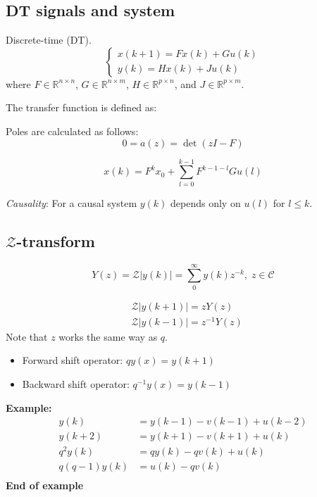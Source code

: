 \begin{multicols}{2}
\section{DT signals and system}
Discrete-time (DT).
\begin{equation*}
\left\{\begin{array}{l}
    x(k+1) = Fx(k) + Gu(k) \\
    y(k) = Hx(k) + Ju(k)
    \end{array}\right.
\end{equation*}
where $F\in\mathbb{R}^{n\times n}$, $G\in\mathbb{R}^{n\times m}$,
$H\in\mathbb{R}^{p\times n}$, and $J\in\mathbb{R}^{p\times m}$.

The transfer function is defined as:

Poles are calculated as follows:
\begin{equation*}
    0 = a(z) = \det(zI - F)
\end{equation*}

\begin{equation*}
   x(k) = F^k x_0 + \sum^{k-1}_{l=0} F^{k-1-l}Gu(l)
\end{equation*}

\textit{Causality}: For a causal system $y(k)$ depends only on $u(l)$ for $l \leq k$.


\subsection{$\mathcal{Z}$-transform}
\begin{equation*}
    Y(z) = \mathcal{Z}\lvert y(k) \rvert = \sum^{\infty}_{0} y(k)z^{-k}, \; z\in\mathcal{C}
\end{equation*}

\begin{align*}
    &\mathcal{Z}\lvert y(k+1) \rvert = zY(z) \\
    &\mathcal{Z}\lvert y(k-1) \rvert = z^{-1}Y(z)
\end{align*}
Note that $z$ works the same way as $q$.

\begin{itemize}
    \item Forward shift operator: $qy(x) = y(k+1)$
    \item Backward shift operator: $q^{-1}y(x) = y(k-1)$
\end{itemize}

\textbf{Example:}
\begin{align*}
    y(k) &= y(k-1) - v(k-1) + u(k-2) \\
    y(k+2) &= y(k+1) - v(k+1) + u(k) \\
    q^2y(k) &= qy(k) - qv(k) + u(k) \\
    q(q-1)y(k) &= u(k) - qv(k) \\
\end{align*}
\textbf{End of example}



\end{multicols}
